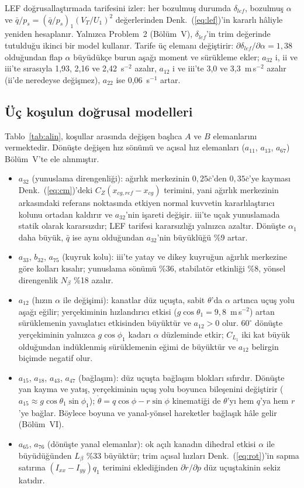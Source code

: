 \documentclass[conf]{new-aiaa}
\begin{document}
LEF doğrusallaştırmada tarifesini izler: her bozulmuş durumda $\delta_{lef}$, bozulmuş $\alpha$ ve $\bar q/p_s=(\bar q/p_s)_1(V_T/U_1)^2$ değerlerinden Denk.~(\ref{eq:lef})'in kararlı hâliyle yeniden hesaplanır. Yalnızca Problem~2 (Bölüm~V), $\delta_{lef}$'in trim değerinde tutulduğu ikinci bir model kullanır. Tarife üç elemanı değiştirir: $\partial\delta_{lef}/\partial\alpha=1,38$ olduğundan flap $\alpha$ büyüdükçe burun aşağı moment ve sürükleme ekler; $a_{32}$ i, ii ve iii'te sırasıyla 1,93, 2,16 ve 2,42~s$^{-2}$ azalır, $a_{12}$ i ve iii'te 3,0 ve 3,3~m\,s$^{-2}$ azalır (ii'de neredeyse değişmez), $a_{22}$ ise 0,06~s$^{-1}$ artar.

\subsection{Üç koşulun doğrusal modelleri}
Tablo~\ref{tab:alin}, koşullar arasında değişen başlıca $A$ ve $B$ elemanlarını vermektedir. Dönüşte değişen hız sönümü ve açısal hız elemanları ($a_{11}$, $a_{13}$, $a_{67}$) Bölüm~V'te ele alınmıştır.
\begin{itemize}
\item $a_{32}$ (yunuslama direngenliği): ağırlık merkezinin $0,25\bar c$'den $0,35\bar c$'ye kayması Denk.~(\ref{eq:cm})'deki $C_Z(x_{cg,ref}-x_{cg})$ terimini, yani ağırlık merkezinin arkasındaki referans noktasında etkiyen normal kuvvetin kararlılaştırıcı kolunu ortadan kaldırır ve $a_{32}$'nin işareti değişir. iii'te uçak yunuslamada statik olarak kararsızdır; LEF tarifesi kararsızlığı yalnızca azaltır. Dönüşte $\alpha_1$ daha büyük, $\bar q$ ise aynı olduğundan $a_{32}$'nin büyüklüğü \%9 artar.
\item $a_{33}$, $b_{32}$, $a_{75}$ (kuyruk kolu): iii'te yatay ve dikey kuyruğun ağırlık merkezine göre kolları kısalır; yunuslama sönümü \%36, stabilatör etkinliği \%8, yönsel direngenlik $N_\beta$ \%18 azalır.
\item $a_{12}$ (hızın $\alpha$ ile değişimi): kanatlar düz uçuşta, sabit $\theta$'da $\alpha$ artınca uçuş yolu aşağı eğilir; yerçekiminin hızlandırıcı etkisi ($g\cos\theta_1=9,8$~m\,s$^{-2}$) artan sürüklemenin yavaşlatıcı etkisinden büyüktür ve $a_{12}>0$ olur. $60^\circ$ dönüşte yerçekiminin yalnızca $g\cos\phi_1$ kadarı $\alpha$ düzleminde etkir; $C_{L_1}$ iki kat büyük olduğundan indüklenmiş sürüklemenin eğimi de büyüktür ve $a_{12}$ belirgin biçimde negatif olur.
\item $a_{15}$, $a_{18}$, $a_{43}$, $a_{47}$ (bağlaşım): düz uçuşta bağlaşım blokları sıfırdır. Dönüşte yan kayma ve yatış, yerçekiminin uçuş yolu boyunca bileşenini değiştirir ($a_{15}\approx g\cos\theta_1\sin\phi_1$); $\dot\theta=q\cos\phi-r\sin\phi$ kinematiği de $\theta$'yı hem $q$'ya hem $r$'ye bağlar. Böylece boyuna ve yanal-yönsel hareketler bağlaşık hâle gelir (Bölüm~VI).
\item $a_{65}$, $a_{76}$ (dönüşte yanal elemanlar): ok açılı kanadın dihedral etkisi $\alpha$ ile büyüdüğünden $L_\beta$ \%33 büyüktür; trim açısal hızları Denk.~(\ref{eq:rot})'in sapma satırına $(I_{xx}-I_{yy})q_1$ terimini eklediğinden $\partial\dot r/\partial p$ düz uçuştakinin sekiz katıdır.
\end{itemize}
\end{document}
